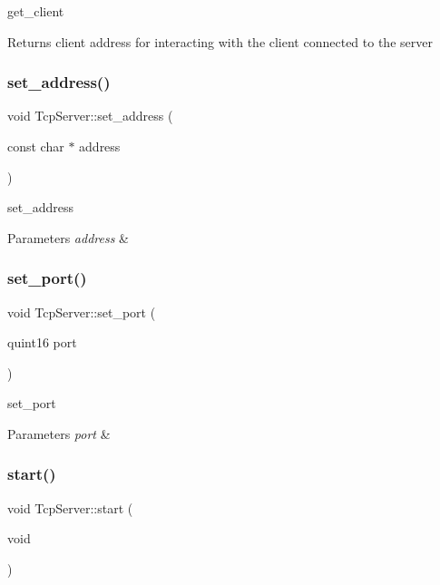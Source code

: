 get\+\_\+client 

\begin{DoxyReturn}{Returns}
client address for interacting with the client connected to the server 
\end{DoxyReturn}
\mbox{\label{class_tcp_server_a3496c0dfa5e3c1cb5bf794739508eda4}} 
\subsubsection{\texorpdfstring{set\_address()}{set\_address()}}
{\footnotesize\ttfamily void Tcp\+Server\+::set\+\_\+address (\begin{DoxyParamCaption}\item[{const char $\ast$}]{address }\end{DoxyParamCaption})}



set\+\_\+address 


\begin{DoxyParams}{Parameters}
{\em address} & \\
\hline
\end{DoxyParams}
\mbox{\label{class_tcp_server_aaf6005b12641ab81bcf91099d9255437}} 
\subsubsection{\texorpdfstring{set\_port()}{set\_port()}}
{\footnotesize\ttfamily void Tcp\+Server\+::set\+\_\+port (\begin{DoxyParamCaption}\item[{quint16}]{port }\end{DoxyParamCaption})}



set\+\_\+port 


\begin{DoxyParams}{Parameters}
{\em port} & \\
\hline
\end{DoxyParams}
\mbox{\label{class_tcp_server_ab9a387d38fd311ae853b4b4006504096}} 
\subsubsection{\texorpdfstring{start()}{start()}}
{\footnotesize\ttfamily void Tcp\+Server\+::start (\begin{DoxyParamCaption}\item[{void}]{ }\end{DoxyParamCaption})}



